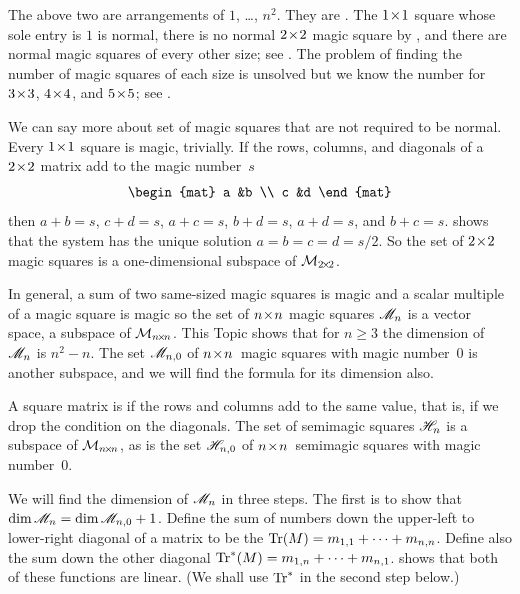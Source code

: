 The above two are arrangements of $1$, \ldots, $n^2$.
They are .
The $1 \! \times \! 1$ square whose sole entry is $1$ is normal, there is
no normal $2 \! \times \! 2$ magic square by ,
and there are normal magic squares of every other size; 
see \cite{WikipediaMagicSquare}.
The problem of finding the number of magic squares of each size is unsolved
but we know the number for $3 \! \times \! 3$, $4 \! \times \! 4$, and $5 \! \times \! 5$;
see \cite{OnlineEncyclopedia}.
 
We can say more about set of 
magic squares that are not required to be normal.
Every $1 \! \times \! 1$ square is magic, trivially.
If the rows, columns, and diagonals of a $2 \! \times \! 2$ matrix add to 
the magic number~$s$
\begin{equation*}
  \begin{mat}
    a  &b  \\
    c  &d
  \end{mat}
\end{equation*}
then $a+b=s$, $c+d=s$, $a+c=s$, $b+d=s$, $a+d=s$, and $b+c=s$.
 shows that
the system has the unique solution $a=b=c=d=s/2$.
So the set of $2 \! \times \! 2$ magic squares
is a one-dimensional subspace of $\mathcal{M}_{2 \! \times \! 2}$.

In general, a sum of two same-sized magic squares is magic and a 
scalar multiple of a magic square is magic so the set of 
$n \! \times \! n$ magic squares
$\mathscr{M}_n$ is a vector space, a subspace of $\mathcal{M}_{n \! \times \! n}$.
This Topic shows that for $n\geq 3$ the 
dimension of
$\mathscr{M}_n$ is $n^2-n$.
The set $\mathscr{M}_{n,0}$ of $n \! \times \! n$~magic squares with magic number~$0$ 
is another subspace, and we will find the formula for its dimension also.

A square matrix is  if 
the rows and columns add to the same value, that is, if we drop the
condition on the diagonals.
The set of semimagic squares $\mathscr{H}_n$ 
is a subspace of $\mathcal{M}_{n \! \times \! n}$, as is
the set $\mathscr{H}_{n,0}$  
of $n \! \times \! n$~semimagic squares with magic number~$0$. 

We will find the dimension of 
$\mathscr{M}_n$ 
in three steps.
The first is to show that $\dim\mathscr{M}_n=\dim\mathscr{M}_{n,0}+1$.
Define 
the sum of numbers down the upper-left to lower-right diagonal of a matrix
to be the
$\operatorname{Tr} (M)=m_{1,1}+\cdots+m_{n,n}$.
Define also
the sum down the other diagonal
$\operatorname{Tr}^* (M)=m_{1,n}+\cdots+m_{n,1}$.
 shows that both of these functions 
are linear.
(We shall use $\operatorname{Tr}^*$ in the second step below.)

